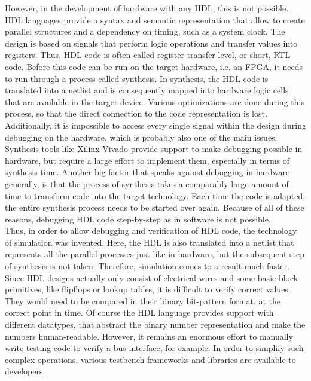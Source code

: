 However, in the development of hardware with any HDL, this is not possible.
HDL languages provide a syntax and semantic representation that allow to create parallel structures and a dependency on timing, such as a system clock.
The design is based on signals that perform logic operations and transfer values into registers.
Thus, HDL code is often called register-transfer level, or short, RTL code.
Before this code can be run on the target hardware, i.e. an FPGA, it needs to run through a process called synthesis.
In synthesis, the HDL code is translated into a netlist and is consequently mapped into hardware logic cells that are available in the target device.
Various optimizations are done during this process, so that the direct connection to the code representation is lost.
Additionally, it is impossible to access every single signal within the design during debugging on the hardware, which is probably also one of the main issues.
Synthesis tools like Xilinx Vivado provide support to make debugging possible in hardware, but require a large effort to implement them, especially in terms of synthesis time.
Another big factor that speaks against debugging in hardware generally, is that the process of synthesis takes a comparably large amount of time to transform code into the target technology.
Each time the code is adapted, the entire synthesis process needs to be started over again.
Because of all of these reasons, debugging HDL code step-by-step as in software is not possible.\\

Thus, in order to allow debugging and verification of HDL code, the technology of simulation was invented.
Here, the HDL is also translated into a netlist that represents all the parallel processes just like in hardware, but the subsequent step of synthesis is not taken.
Therefore, simulation comes to a result much faster.
Since HDL designs actually only consist of electrical wires and some basic block primitives, like flipflops or lookup tables, it is difficult to verify correct values.
They would need to be compared in their binary bit-pattern format, at the correct point in time.
Of course the HDL language provides support with different datatypes, that abstract the binary number representation and make the numbers human-readable.
However, it remains an enormous effort to manually write testing code to verify a bus interface, for example.
In order to simplify such complex operations, various testbench frameworks and libraries are available to developers.


